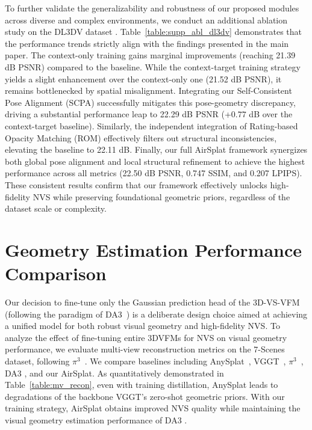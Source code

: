 \begin{table}[t]
\begin{center}
    \scriptsize
    \caption{Ablation analysis on DL3DV dataset \cite{ling2024dl3dv} under 12 input views.}
    \resizebox{0.8\linewidth}{!}{ 
        
    }
\label{table:supp_abl_dl3dv}
\end{center}
\end{table}

To further validate the generalizability and robustness of our proposed modules across diverse and complex environments, we conduct an additional ablation study on the DL3DV dataset \cite{ling2024dl3dv}. 
Table~\ref{table:supp_abl_dl3dv} demonstrates that the performance trends strictly align with the findings presented in the main paper. 
The context-only training gains marginal improvements (reaching 21.39 dB PSNR) compared to the baseline.
While the context-target training strategy yields a slight enhancement over the context-only one (21.52 dB PSNR), it remains bottlenecked by spatial misalignment. 
Integrating our Self-Consistent Pose Alignment (SCPA) successfully mitigates this pose-geometry discrepancy, driving a substantial performance leap to 22.29 dB PSNR (+$0.77$ dB over the context-target baseline). 
Similarly, the independent integration of Rating-based Opacity Matching (ROM) effectively filters out structural inconsistencies, elevating the baseline to 22.11 dB. 
Finally, our full AirSplat framework synergizes both global pose alignment and local structural refinement to achieve the highest performance across all metrics (22.50 dB PSNR, 0.747 SSIM, and 0.207 LPIPS). 
These consistent results confirm that our framework effectively unlocks high-fidelity NVS while preserving foundational geometric priors, regardless of the dataset scale or complexity.


\section{Geometry Estimation Performance Comparison}
\label{sec:supp_geometry_estimation}
Our decision to fine-tune only the Gaussian prediction head of the 3D-VS-VFM (following the paradigm of DA3~\cite{lin2025da3}) is a deliberate design choice aimed at achieving a unified model for both robust visual geometry and high-fidelity NVS. 
To analyze the effect of fine-tuning entire 3DVFMs for NVS on visual geometry performance, we evaluate multi-view reconstruction metrics on the 7-Scenes~\cite{6619221} dataset, following $\pi^3$~\cite{wang2025pi3}. 
We compare baselines including AnySplat~\cite{jiang2025anysplat}, VGGT~\cite{wang2025vggt}, $\pi^3$~\cite{wang2025pi3}, DA3 \cite{lin2025da3}, and our AirSplat. As quantitatively demonstrated in Table~\ref{table:mv_recon}, even with training distillation, AnySplat leads to degradations of the backbone VGGT's zero-shot geometric priors. With our training strategy, AirSplat obtains improved NVS quality while maintaining the visual geometry estimation performance of DA3 \cite{lin2025da3}.

